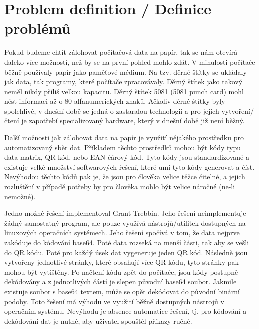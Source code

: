 \documentclass[conference]{IEEEtran}
\begin{document}

\section{Problem definition / Definice problémů}

Pokud budeme chtít zálohovat počítačová data na papír, tak se nám otevírá daleko více možností, než by se na první pohled mohlo zdát. V minulosti počítače běžně používaly papír jako paměťové médium. Na tzv. děrné štítky se ukládaly jak data, tak programy, které počítače zpracovávaly. Děrný štítek jako takový neměl nikdy příliš velkou kapacitu. Děrný štítek 5081 (5081 punch card) mohl nést informaci až o 80 alfanumerických znaků. Ačkoliv děrné štítky byly spolehlivé, v dnešní době se jedná o zastaralou technologii a pro jejich vytvoření/čtení je zapotřebí specializovaný hardware, který v dnešní době již není běžný. 


Další možnosti jak zálohovat data na papír je využití nějakého prostředku pro automatizovaný sběr dat. Příkladem těchto prostředků mohou být kódy typu data matrix, QR kód, nebo EAN čárový kód. Tyto kódy jsou standardizované a existuje velké množství softwarových řešení, které umí tyto kódy generovat a číst. Nevýhodou těchto kódů pak je, že jsou pro člověka velice těžce čitelné, a jejich rozluštění v případě potřeby by pro člověka mohlo být velice náročné (ne-li nemožné).

Jedno možné řešení implementoval Grant Trebbin. Jeho řešení neimplementuje žádný samostatný program, ale pouze využívá nástrojů/utilitek dostupných na linuxových operačních systémech. Jeho řešení spočívá v tom, že data nejprve zakóduje do kódování base64. Poté data rozseká na menší části, tak aby se vešli do QR kódu. Poté pro každý úsek dat vygeneruje jeden QR kód. Následně jsou vytvořeny jednotlivé stránky, které obsahují více QR kódu, tyto stránky pak mohou být vytištěny. Po načtení kódu zpět do počítače, jsou kódy postupně dekódovány a z jednotlivých částí je slepen původní base64 soubor. Jakmile existuje soubor s base64 textem, může se opět dekódovat do původní binární podoby. Toto řešení má výhodu ve využití běžně dostupných nástrojů v operačním systému. Nevýhodu je absence automatice řešení, tj. pro kódování a dekódování dat je nutné, aby uživatel spouštěl příkazy ručně.
\end{document}
